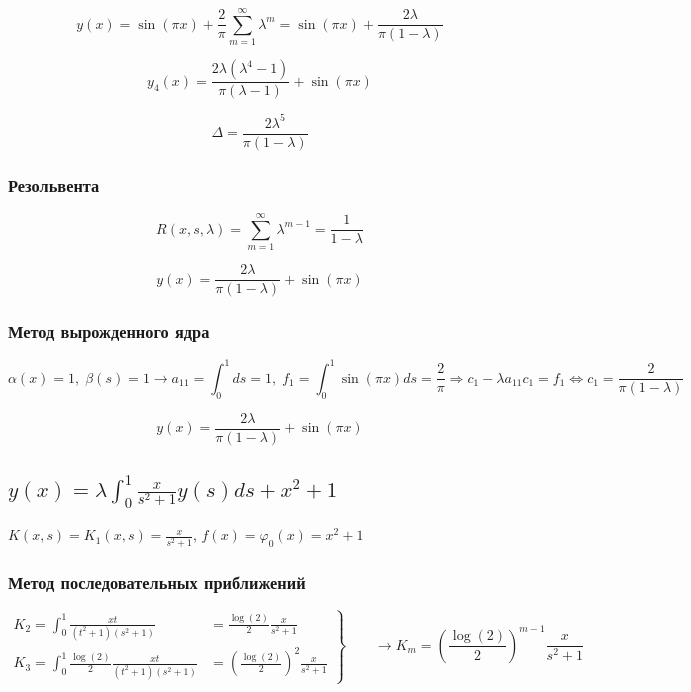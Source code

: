 \documentclass[
11pt,
master, %
subf, %
href, %
colorlinks=true, %
times, %
]{disser}
\begin{document}
$$y(x) = \sin(\pi x) + \frac{2}{\pi} \sum_{m=1}^{\infty} \lambda^m = \sin(\pi x) + \frac{2 \lambda}{\pi(1 - \lambda)}$$

$$y_4(x) = \frac{2 \lambda  \left(\lambda^4-1\right)}{\pi  (\lambda -1)}+\sin(\pi  x)$$

$$\Delta = \frac{2\lambda ^5}{\pi(1 -\lambda)}$$

\subsubsection{Резольвента}

$$R(x,s,\lambda) = \sum_{m=1}^{\infty} \lambda^{m-1} = \frac{1}{1 - \lambda}$$

$$y(x) = \frac{2\lambda}{\pi(1 - \lambda)} + \sin(\pi x)$$

\subsubsection{Метод вырожденного ядра}

$$\alpha(x) = 1,\;\beta(s) = 1 \rightarrow a_{11} = \int_{0}^{1} ds = 1, \; f_1 = \int_{0}^{1} \sin(\pi x) ds = \frac{2}{\pi} \Rightarrow c_1 - \lambda a_{11} c_1 = f_1 \Longleftrightarrow c_1 = \frac{2}{\pi(1-\lambda)}$$

$$y(x) = \frac{2\lambda}{\pi(1 - \lambda)} + \sin(\pi x)$$

\subsection{$\displaystyle y(x) = \lambda \int_{0}^{1} \frac{x}{s^2 + 1} y(s)ds + x^2 + 1$}

$K(x,s) = K_1(x,s) = \frac{x}{s^2 + 1}$, $f(x)= \varphi_0(x) = x^2 + 1$

\subsubsection{Метод последовательных приближений}

\begin{equation}
 \left.\begin{aligned}
        K_2 = \int_{0}^{1} \frac{xt}{(t^2 + 1)(s^2 + 1)} &= \frac{\log(2)}{2} \frac{x}{s^2 + 1}\\
        K_3 = \int_{0}^{1} \frac{\log(2)}{2} \frac{xt}{(t^2 + 1)(s^2 + 1)} &= \left(\frac{\log(2)}{2}\right)^2 \frac{x}{s^2 + 1}
       \end{aligned}
 \right\}
 \qquad \longrightarrow K_m = \left(\frac{\log(2)}{2}\right)^{m-1} \frac{x}{s^2 + 1}
\end{equation}
\end{document}
